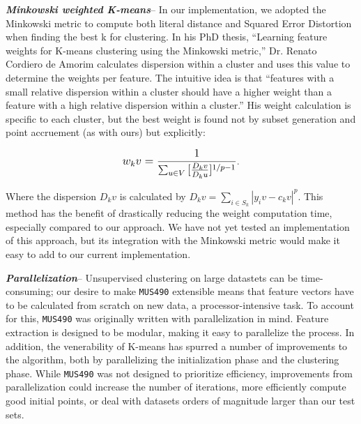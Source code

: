 \documentclass[12pt,twocolumn,titlepage]{article}
\begin{document}
\emph{\textbf{Minkowski weighted K-means}}-- In our implementation, we adopted the Minkowski metric to compute both literal distance and Squared Error Distortion when finding the best k for clustering. In his PhD thesis, ``Learning feature weights for K-means clustering using the Minkowski metric,'' Dr. Renato Cordiero de Amorim calculates dispersion within a cluster and uses this value to determine the weights per feature. The intuitive idea is that ``features with a small relative dispersion within a cluster should have a higher weight than a feature with a high relative dispersion within a cluster.'' \cite{MinkWeightedK} His weight calculation is specific to each cluster, but the best weight is found not by subset generation and point accruement (as with ours) but explicitly: 

\begin{equation}\label{}
\mathlarger{w_kv = \frac{1}{\sum_{u \in V}{}{[\frac{D_kv}{D_ku}]^{1 / p-1}}}}.
\end{equation}

Where the dispersion $D_kv$ is calculated by $D_kv = \sum_{i \in S_k}{}{|y_iv - c_kv|^p}$. This method has the benefit of drastically reducing the weight computation time, especially compared to our approach. We have not yet tested an implementation of this approach, but its integration with the Minkowski metric would make it easy to add to our current implementation.

\emph{\textbf{Parallelization}}-- Unsupervised clustering on large datastets can be time-consuming; our desire to make \texttt{MUS490} extensible means that feature vectors have to be calculated from scratch on new data, a processor-intensive task. To account for this, \texttt{MUS490} was originally written with parallelization in mind. Feature extraction is designed to be modular, making it easy to parallelize the process. In addition, the venerability of K-means has spurred a number of improvements to the algorithm, both by parallelizing the initialization phase \cite{KMeans++} and the clustering phase. \cite{ParallelK} While \texttt{MUS490} was not designed to prioritize efficiency, improvements from parallelization could increase the number of iterations, more efficiently compute good initial points, or deal with datasets orders of magnitude larger than our test sets.
\end{document}

